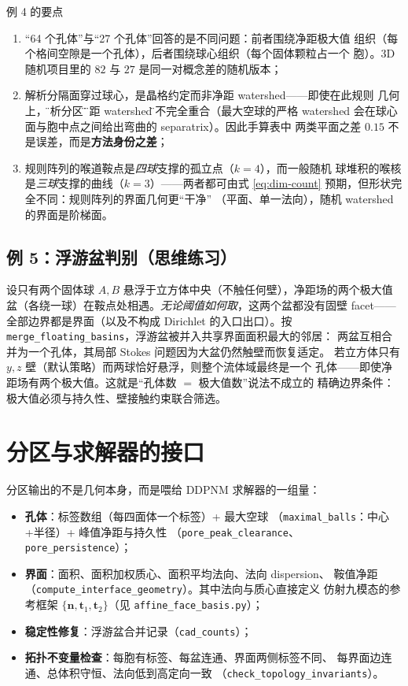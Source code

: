 \documentclass[UTF8,zihao=-4]{ctexart}
\newcommand{\normal}{\bm n}
\begin{document}
\begin{keybox}{例 4 的要点}
\begin{enumerate}
  \item ``64 个孔体''与``27 个孔体''回答的是不同问题：前者围绕净距极大值
  组织（每个格间空隙是一个孔体），后者围绕球心组织（每个固体颗粒占一个
  胞）。3D 随机项目里的 $82$ 与 $27$ 是同一对概念差的随机版本；
  \item 解析分隔面穿过球心，是晶格约定而非净距 watershed——即使在此规则
  几何上，\"解析分区\"与\"净距 watershed\"也不完全重合（最大空球的严格
  watershed 会在球心面与胞中点之间给出弯曲的 separatrix）。因此手算表中
  两类平面之差 $0.15$ 不是误差，而是\textbf{方法身份之差}；
  \item 规则阵列的喉道鞍点是\emph{四球}支撑的孤立点（$k=4$），而一般随机
  球堆积的喉核是\emph{三球}支撑的曲线（$k=3$）——两者都可由式
  \eqref{eq:dim-count} 预期，但形状完全不同：规则阵列的界面几何更``干净''
  （平面、单一法向），随机 watershed 的界面是阶梯面。
\end{enumerate}
\end{keybox}

\subsection{例 5：浮游盆判别（思维练习）}

设只有两个固体球 $A,B$ 悬浮于立方体中央（不触任何壁），净距场的两个极大值
盆（各绕一球）在鞍点处相遇。\emph{无论阈值如何取}，这两个盆都没有固壁
facet——全部边界都是界面（以及不构成 Dirichlet 的入口出口）。按
\texttt{merge\_floating\_basins}，浮游盆被并入共享界面面积最大的邻居：
两盆互相合并为一个孔体，其局部 Stokes 问题因为大盆仍然触壁而恢复适定。
若立方体只有 $y,z$ 壁（默认策略）而两球恰好悬浮，则整个流体域最终是一个
孔体——即使净距场有两个极大值。这就是``孔体数 $=$ 极大值数''说法不成立的
精确边界条件：极大值必须与持久性、壁接触约束联合筛选。

\section{分区与求解器的接口}

分区输出的不是几何本身，而是喂给 DDPNM 求解器的一组量：
\begin{itemize}
  \item \textbf{孔体}：标签数组（每四面体一个标签）+ 最大空球
  （\texttt{maximal\_balls}：中心+半径）+ 峰值净距与持久性
  （\texttt{pore\_peak\_clearance}、\texttt{pore\_persistence}）；
  \item \textbf{界面}：面积、面积加权质心、面积平均法向、法向 dispersion、
  鞍值净距（\texttt{compute\_\allowbreak{}interface\_geometry}）。其中法向与质心直接定义
  仿射九模态的参考框架 $\{ \normal,\bm t_1,\bm t_2\}$（见
  \texttt{affine\_face\_basis.py}）；
  \item \textbf{稳定性修复}：浮游盆合并记录（\texttt{cad\_counts}）；
  \item \textbf{拓扑不变量检查}：每胞有标签、每盆连通、界面两侧标签不同、
  每界面边连通、总体积守恒、法向低到高定向一致
  （\texttt{check\_topology\_invariants}）。
\end{itemize}
\end{document}
